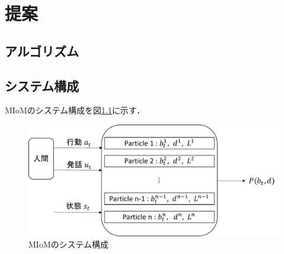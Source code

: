 \chapter{提案}

\section{アルゴリズム}


\section{システム構成}
\par
MIoMのシステム構成を図\ref{fig:sys_arc}に示す．

\begin{figure}[htbp]
  \begin{center}
    \includegraphics[scale=0.85]{./bt1.pdf}
    \caption{MIoMのシステム構成}
    \label{fig:sys_arc}
  \end{center}
\end{figure}
